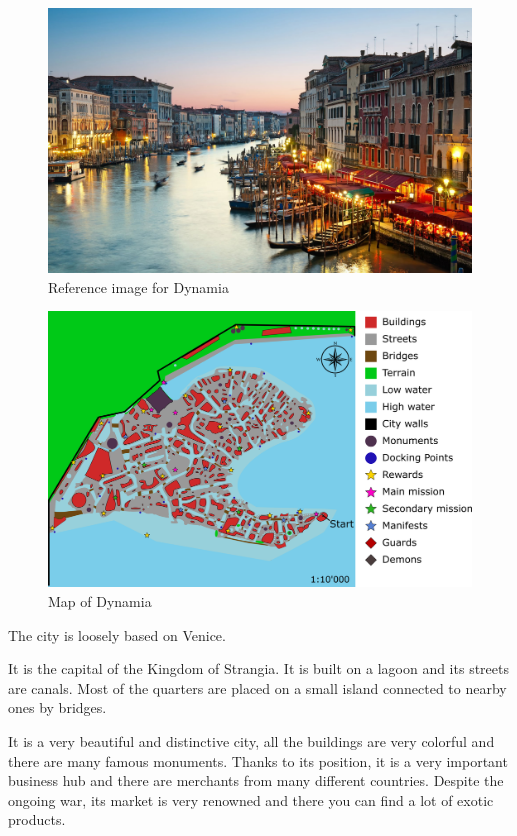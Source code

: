 \begin{figure}[H]
  \centering
  \includegraphics[width=\textwidth]{../../References/Images/Dynamia/venice-restaurants-by-canal}
  \caption{Reference image for Dynamia}
\end{figure}

\begin{figure}[H]
  \centering
  \includegraphics[width=\textwidth]{Images/Maps/dynamia}
  \caption{Map of Dynamia}
\end{figure}

The city is loosely based on Venice.

It is the capital of the Kingdom of Strangia. It is built on a lagoon and its streets are canals. Most of the quarters are placed on a small island connected to nearby ones by bridges.

It is a very beautiful and distinctive city, all the buildings are very colorful and there are many famous monuments. Thanks to its position, it is a very important business hub and there are merchants from many different countries. Despite the ongoing war, its market is very renowned and there you can find a lot of exotic products.

